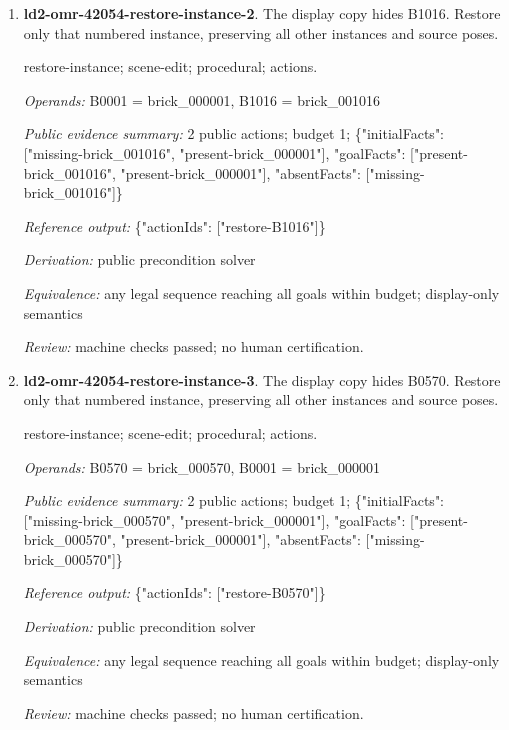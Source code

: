 \begin{enumerate}
\item \textbf{ld2-omr-42054-restore-instance-2}. The display copy hides B1016. Restore only that numbered instance, preserving all other instances and source poses.
\par{\small restore-instance; scene-edit; procedural; actions.\par\textit{Operands:} B0001 = brick\_000001, B1016 = brick\_001016\par\textit{Public evidence summary:} 2 public actions; budget 1; \{"initialFacts": ["missing-brick\_001016", "present-brick\_000001"], "goalFacts": ["present-brick\_001016", "present-brick\_000001"], "absentFacts": ["missing-brick\_001016"]\}\par\textit{Reference output:} \{"actionIds": ["restore-B1016"]\}\par\textit{Derivation:} public precondition solver\par\textit{Equivalence:} any legal sequence reaching all goals within budget; display-only semantics\par\textit{Review:} machine checks passed; no human certification.}
\item \textbf{ld2-omr-42054-restore-instance-3}. The display copy hides B0570. Restore only that numbered instance, preserving all other instances and source poses.
\par{\small restore-instance; scene-edit; procedural; actions.\par\textit{Operands:} B0570 = brick\_000570, B0001 = brick\_000001\par\textit{Public evidence summary:} 2 public actions; budget 1; \{"initialFacts": ["missing-brick\_000570", "present-brick\_000001"], "goalFacts": ["present-brick\_000570", "present-brick\_000001"], "absentFacts": ["missing-brick\_000570"]\}\par\textit{Reference output:} \{"actionIds": ["restore-B0570"]\}\par\textit{Derivation:} public precondition solver\par\textit{Equivalence:} any legal sequence reaching all goals within budget; display-only semantics\par\textit{Review:} machine checks passed; no human certification.}
\end{enumerate}
